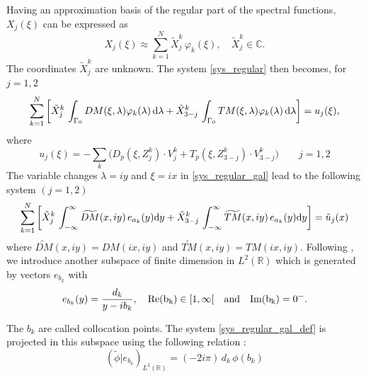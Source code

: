 Having an approximation basis of the regular part of the spectral functions, $X_j(\xi)$ can be expressed as
\begin{equation}
\label{regular_part_decomp}
X_j(\xi) \approx \sum_{k=1}^N \tilde{X}_j^k \, \varphi_k(\xi), \quad \tilde{X}_j^k \in \mathbb{C}.
\end{equation}
The coordinates $\tilde{X}_j^k$ are unknown. The system \eqref{sys_regular} then becomes, for $j=1,2$
\begin{equation}
\label{sys_regular_gal}
\sum_{k=1}^N \left[ \tilde{X}_j^k \, \int_{\Gamma_0} DM(\xi,\lambda) \varphi_k(\lambda) \, {\rm d} \lambda + \tilde{X}_{3-j}^k \, \int_{\Gamma_0} TM(\xi,\lambda) \varphi_k(\lambda) \, {\rm d} \lambda \right] = u_j(\xi), 
\end{equation}
where
\begin{equation}
\label{second_member}
u_j(\xi) = -\sum_k \Big( D_p(\xi,Z_j^k)\cdot V_j^k+ T_p(\xi,Z_{3-j}^k)\cdot V_{3-j}^k\Big) \qquad j=1,2
\end{equation}
The variable changes $\lambda = iy$ and $\xi = ix$ in \eqref{sys_regular_gal} lead to the following system $(j=1,2)$
\begin{equation}
\label{sys_regular_gal_def}
\sum_{k=1}^N \left[ \tilde{X}_j^k \, \int_{-\infty}^\infty  \widetilde{DM}(x,iy) \, e_{a_k}(y) {\rm d} y + \tilde{X}_{3-j}^k \, \int_{-\infty}^\infty  \widetilde{TM}(x,iy) \, e_{a_k}(y) {\rm d} y \right] = \tilde u_j(x) \\
\end{equation}
where $\widetilde{DM}(x,iy) = DM(ix,iy)$ and $\widetilde{TM}(x,iy) = TM(ix,iy)$. Following \cite{CroisilleLebeau}, we introduce another subspace of finite dimension in $L^2(\mathbb{R})$ which is generated by vectors $e_{b_k}$ with
\begin{equation}
\label{points_collocation}
e_{b_k}(y)=\frac{d_k}{y-ib_k}, \quad  \rm Re (b_k) \in [1,\infty[  \quad \text{and}  \quad {\rm Im} (b_k) = 0^-.
\end{equation}

The $b_k$ are called collocation points.  The system \eqref{sys_regular_gal_def} is projected in this subspace using the following relation :
\begin{equation}
\label{dot_product}
(\tilde \phi\vert e_{b_k})_{L^2(\mathbb R)}= (-2i\pi) \, d_k \,  \phi (b_k)
\end{equation}

